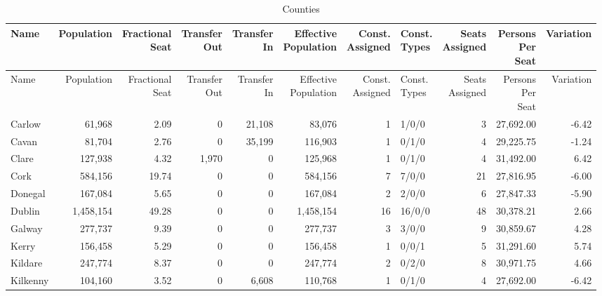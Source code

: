 \documentclass[a4paper]{article}
\begin{document}
\begin{longtable}{lrrrrrrlrrr}
\caption{Counties}
\\ \toprule
Name &Population &\shortstack{Fractional\\Seat} &\shortstack{Transfer\\Out} &\shortstack{Transfer\\In} &\shortstack{Effective\\Population} &\shortstack{Const.\\Assigned} &\shortstack{Const.\\Types} &\shortstack{Seats\\Assigned} &\shortstack{Persons\\Per\\Seat} &Variation \\ \midrule
\endfirsthead
\toprule
Name &Population &\shortstack{Fractional\\Seat} &\shortstack{Transfer\\Out} &\shortstack{Transfer\\In} &\shortstack{Effective\\Population} &\shortstack{Const.\\Assigned} &\shortstack{Const.\\Types} &\shortstack{Seats\\Assigned} &\shortstack{Persons\\Per\\Seat} &Variation \\ \midrule
\endhead
\bottomrule
\endfoot
Carlow&61,968& 2.09&0&21,108&83,076&1&1/0/0&3&27,692.00&-6.42\\ 
Cavan&81,704& 2.76&0&35,199&116,903&1&0/1/0&4&29,225.75&-1.24\\ 
Clare&127,938& 4.32&1,970&0&125,968&1&0/1/0&4&31,492.00& 6.42\\ 
Cork&584,156&19.74&0&0&584,156&7&7/0/0&21&27,816.95&-6.00\\ 
Donegal&167,084& 5.65&0&0&167,084&2&2/0/0&6&27,847.33&-5.90\\ 
Dublin&1,458,154&49.28&0&0&1,458,154&16&16/0/0&48&30,378.21& 2.66\\ 
Galway&277,737& 9.39&0&0&277,737&3&3/0/0&9&30,859.67& 4.28\\ 
Kerry&156,458& 5.29&0&0&156,458&1&0/0/1&5&31,291.60& 5.74\\ 
Kildare&247,774& 8.37&0&0&247,774&2&0/2/0&8&30,971.75& 4.66\\ 
Kilkenny&104,160& 3.52&0&6,608&110,768&1&0/1/0&4&27,692.00&-6.42\\ 

\end{longtable}
\end{document}
